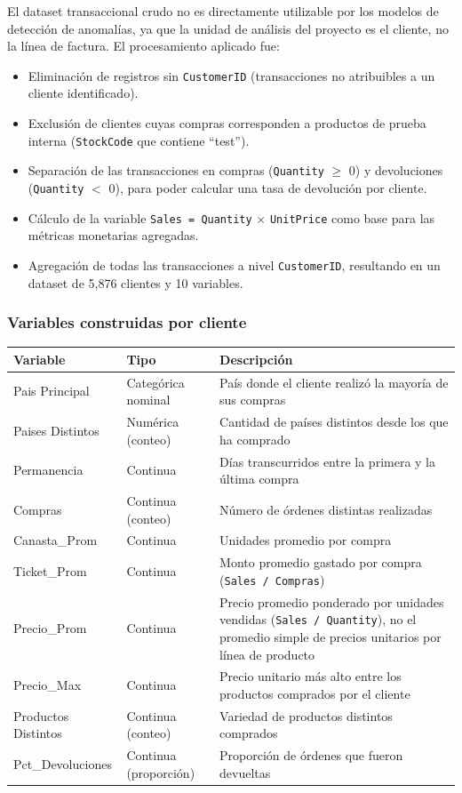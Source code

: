 \documentclass[11pt]{article}
\begin{document}
El dataset transaccional crudo no es directamente utilizable por los modelos de detección de anomalías,
ya que la unidad de análisis del proyecto es el cliente, no la línea de factura. El procesamiento aplicado
fue:

\begin{itemize}
    \item Eliminación de registros sin \texttt{CustomerID} (transacciones no atribuibles a un cliente identificado).
    \item Exclusión de clientes cuyas compras corresponden a productos de prueba interna (\texttt{StockCode} que contiene ``test'').
    \item Separación de las transacciones en compras (\texttt{Quantity} $\geq$ 0) y devoluciones (\texttt{Quantity} $<$ 0), para poder calcular una tasa de devolución por cliente.
    \item Cálculo de la variable \texttt{Sales = Quantity} $\times$ \texttt{UnitPrice} como base para las métricas monetarias agregadas.
    \item Agregación de todas las transacciones a nivel \texttt{CustomerID}, resultando en un dataset de 5,876 clientes y 10 variables.
\end{itemize}

\subsubsection*{Variables construidas por cliente}

\begin{longtable}{L{3.2cm}L{3.2cm}L{8.5cm}}
\toprule
\textbf{Variable} & \textbf{Tipo} & \textbf{Descripción} \\
\midrule
\endhead
Pais Principal & Categórica nominal & País donde el cliente realizó la mayoría de sus compras \\
Paises Distintos & Numérica (conteo) & Cantidad de países distintos desde los que ha comprado \\
Permanencia & Continua & Días transcurridos entre la primera y la última compra \\
Compras & Continua (conteo) & Número de órdenes distintas realizadas \\
Canasta\_Prom & Continua & Unidades promedio por compra \\
Ticket\_Prom & Continua & Monto promedio gastado por compra (\texttt{Sales / Compras}) \\
Precio\_Prom & Continua & Precio promedio ponderado por unidades vendidas (\texttt{Sales / Quantity}), no el promedio simple de precios unitarios por línea de producto \\
Precio\_Max & Continua & Precio unitario más alto entre los productos comprados por el cliente \\
Productos Distintos & Continua (conteo) & Variedad de productos distintos comprados \\
Pct\_Devoluciones & Continua (proporción) & Proporción de órdenes que fueron devueltas \\
\bottomrule
\end{longtable}
\end{document}
